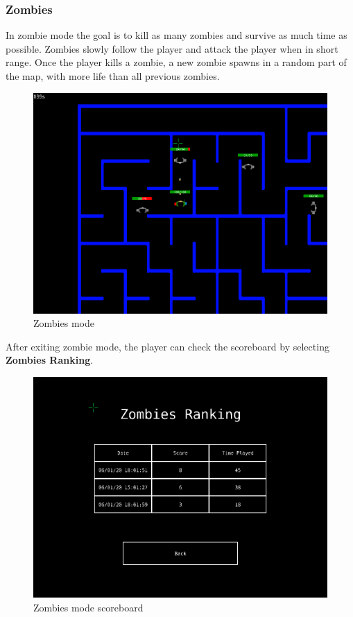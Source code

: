 \documentclass{article}
\theoremstyle{remark}
\begin{document}
\subsubsection{Zombies}
In zombie mode the goal is to kill as many zombies and survive as much time as possible. Zombies slowly follow the player and attack the player when in short range. Once the player kills a zombie, a new zombie spawns in a random part of the map, with more life than all previous zombies.
\begin{figure}[H] \centering
	\includegraphics[scale=0.39]{zombies01}
	\caption{Zombies mode}
\end{figure}
After exiting zombie mode, the player can check the scoreboard by selecting  \textbf{Zombies Ranking}.
\begin{figure}[H] \centering
	\includegraphics[scale=0.39]{zombies_scoreboard01}
	\caption{Zombies mode scoreboard}
\end{figure}
\pagebreak
\end{document}
